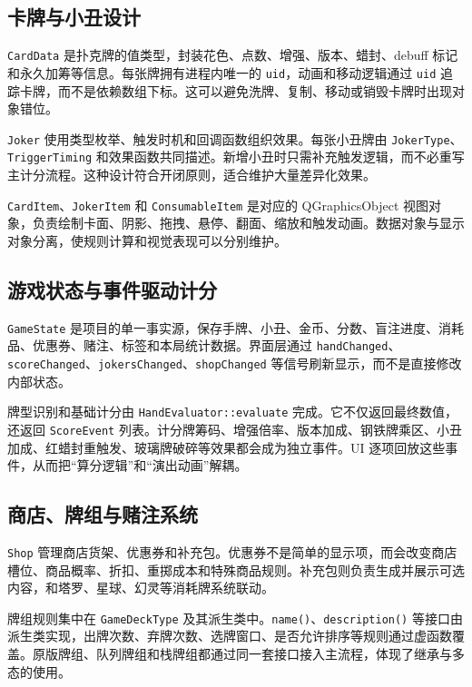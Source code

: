 \documentclass[UTF8,11pt,a4paper]{ctexart}
\newcommand{\code}[1]{\texttt{\small #1}}
\begin{document}
\subsection{卡牌与小丑设计}

\code{CardData} 是扑克牌的值类型，封装花色、点数、增强、版本、蜡封、debuff 标记和永久加筹等信息。每张牌拥有进程内唯一的 \code{uid}，动画和移动逻辑通过 \code{uid} 追踪卡牌，而不是依赖数组下标。这可以避免洗牌、复制、移动或销毁卡牌时出现对象错位。

\code{Joker} 使用类型枚举、触发时机和回调函数组织效果。每张小丑牌由 \code{JokerType}、\code{TriggerTiming} 和效果函数共同描述。新增小丑时只需补充触发逻辑，而不必重写主计分流程。这种设计符合开闭原则，适合维护大量差异化效果。

\code{CardItem}、\code{JokerItem} 和 \code{ConsumableItem} 是对应的 QGraphicsObject 视图对象，负责绘制卡面、阴影、拖拽、悬停、翻面、缩放和触发动画。数据对象与显示对象分离，使规则计算和视觉表现可以分别维护。

\subsection{游戏状态与事件驱动计分}

\code{GameState} 是项目的单一事实源，保存手牌、小丑、金币、分数、盲注进度、消耗品、优惠券、赌注、标签和本局统计数据。界面层通过 \code{handChanged}、\code{scoreChanged}、\code{jokersChanged}、\code{shopChanged} 等信号刷新显示，而不是直接修改内部状态。

牌型识别和基础计分由 \code{HandEvaluator::evaluate} 完成。它不仅返回最终数值，还返回 \code{ScoreEvent} 列表。计分牌筹码、增强倍率、版本加成、钢铁牌乘区、小丑加成、红蜡封重触发、玻璃牌破碎等效果都会成为独立事件。UI 逐项回放这些事件，从而把“算分逻辑”和“演出动画”解耦。

\subsection{商店、牌组与赌注系统}

\code{Shop} 管理商店货架、优惠券和补充包。优惠券不是简单的显示项，而会改变商店槽位、商品概率、折扣、重掷成本和特殊商品规则。补充包则负责生成并展示可选内容，和塔罗、星球、幻灵等消耗牌系统联动。

牌组规则集中在 \code{GameDeckType} 及其派生类中。\code{name()}、\code{description()} 等接口由派生类实现，出牌次数、弃牌次数、选牌窗口、是否允许排序等规则通过虚函数覆盖。原版牌组、队列牌组和栈牌组都通过同一套接口接入主流程，体现了继承与多态的使用。
\end{document}
